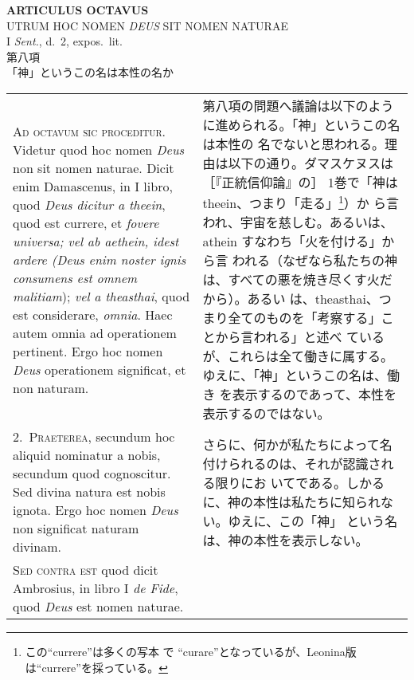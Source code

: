 \documentclass[10pt]{jsarticle}
\begin{document}
\begin{center}
{\Large {\bf ARTICULUS OCTAVUS}}\\
{\large UTRUM HOC NOMEN {\itshape DEUS} SIT NOMEN NATURAE}\\
{\footnotesize I {\itshape Sent.}, d.~2, expos.~lit.}\\
{\Large 第八項\\「神」というこの名は本性の名か}
\end{center}

\begin{longtable}{p{21em}p{21em}}

{\huge A}{\scshape d octavum sic proceditur}. Videtur quod hoc nomen
{\itshape Deus} non sit nomen naturae. Dicit enim Damascenus, in I
libro, quod {\itshape Deus dicitur a theein}, quod est currere, et
{\itshape fovere universa; vel ab aethein, idest ardere (Deus enim
noster ignis consumens est omnem malitiam}); {\itshape vel a
theasthai}, quod est considerare, {\itshape omnia}. Haec autem omnia
ad operationem pertinent. Ergo hoc nomen {\itshape Deus} operationem
significat, et non naturam.

&

第八項の問題へ議論は以下のように進められる。「神」というこの名は本性の
名でないと思われる。理由は以下の通り。ダマスケヌスは［『正統信仰論』の］
1巻で「神はtheein、つまり「走る」\footnote{この``currere''は多くの写本
で ``curare''となっているが、Leonina版は``currere''を採っている。}）か
ら言われ、宇宙を慈しむ。あるいは、athein すなわち「火を付ける」から言
われる（なぜなら私たちの神は、すべての悪を焼き尽くす火だから）。あるい
は、theasthai、つまり全てのものを「考察する」ことから言われる」と述べ
ているが、これらは全て働きに属する。ゆえに、「神」というこの名は、働き
を表示するのであって、本性を表示するのではない。

\\

2.~{\scshape Praeterea}, secundum hoc aliquid nominatur a nobis,
secundum quod cognoscitur. Sed divina natura est nobis ignota. Ergo
hoc nomen {\itshape Deus} non significat naturam divinam.

&

さらに、何かが私たちによって名付けられるのは、それが認識される限りにお
いてである。しかるに、神の本性は私たちに知られない。ゆえに、この「神」
という名は、神の本性を表示しない。

\\

{\scshape Sed contra est} quod dicit Ambrosius, in libro I {\itshape
de Fide}, quod {\itshape Deus} est nomen naturae.


\end{longtable}
\end{document}
